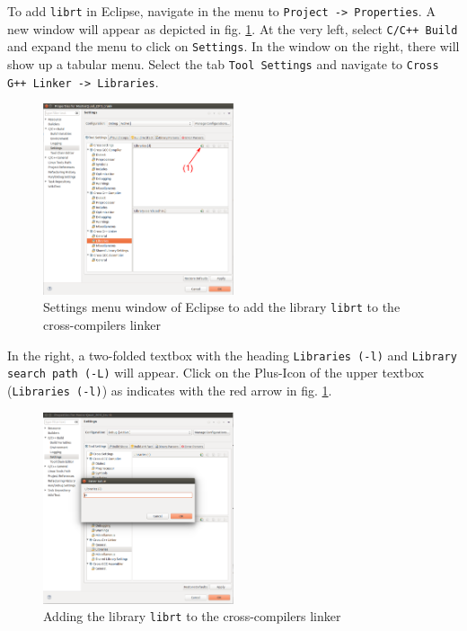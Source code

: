 To add \texttt{librt} in Eclipse, navigate in the menu to \texttt{Project -> Properties}. A new window will appear as depicted in fig. \ref{fig:udpMatlab:udpLib:eclipseSettings}. At the very left, select \texttt{C/C++ Build} and expand the menu to click on \texttt{Settings}. In the window on the right, there will show up a tabular menu. Select the tab \texttt{Tool Settings} and navigate to \texttt{Cross G++ Linker -> Libraries}.

\begin{figure}[H]
    \centering
    \includegraphics[width=0.5\textwidth]{fig/ch-matlab-lib/projectSettings}
    \caption[Settings menu of Eclipse]{Settings menu window of Eclipse to add the library \texttt{librt} to the cross-compilers linker}
    \label{fig:udpMatlab:udpLib:eclipseSettings}
\end{figure}

In the right, a two-folded textbox with the heading \texttt{Libraries (-l)} and \texttt{Library search path (-L)} will appear. Click on the Plus-Icon of the upper textbox (\texttt{Libraries (-l)}) as indicates with the red arrow in fig. \ref{fig:udpMatlab:udpLib:eclipseSettings}.

\begin{figure}[H]
    \centering
    \includegraphics[width=0.5\textwidth]{fig/ch-matlab-lib/projectAddRt}
    \caption[Adding librt to the linker]{Adding the library \texttt{librt} to the cross-compilers linker}
    \label{fig:udpMatlab:udpLib:addLibSettings}
\end{figure}

